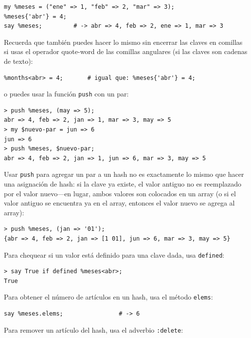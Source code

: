 \begin{verbatim}
my %meses = ("ene" => 1, "feb" => 2, "mar" => 3);
%meses{'abr'} = 4;
say %meses;         # -> abr => 4, feb => 2, ene => 1, mar => 3
\end{verbatim}

Recuerda que también puedes hacer lo mismo sin encerrar 
las claves en comillas si usas el operador quote-word de
las comillas angulares (si las claves son cadenas de texto):

\begin{verbatim}
%months<abr> = 4;       # igual que: %meses{'abr'} = 4;
\end{verbatim}

o puedes usar la función {\tt push} con un par:

\begin{verbatim}
> push %meses, (may => 5);
abr => 4, feb => 2, jan => 1, mar => 3, may => 5
> my $nuevo-par = jun => 6
jun => 6
> push %meses, $nuevo-par;
abr => 4, feb => 2, jan => 1, jun => 6, mar => 3, may => 5
\end{verbatim}
%

Usar {\tt push} para agregar un par a un hash no es exactamente lo
mismo que hacer una asignación de hash: si la clave ya existe,
el valor antiguo no es reemplazado por el valor nuevo---en lugar,
ambos valores son colocados en un array (o si el valor antiguo se 
encuentra ya en el array, entonces el valor nuevo se agrega al 
array):

\begin{verbatim}
> push %meses, (jan => '01');
{abr => 4, feb => 2, jan => [1 01], jun => 6, mar => 3, may => 5}
\end{verbatim}

Para chequear si un valor está definido para una clave dada,
usa {\tt defined}:

\begin{verbatim}
> say True if defined %meses<abr>;
True
\end{verbatim}
%

Para obtener el número de artículos en un hash, usa el 
método {\tt elems}:

\begin{verbatim}
say %meses.elems;                # -> 6
\end{verbatim}

Para remover un artículo del hash, usa el adverbio {\tt :delete}:


